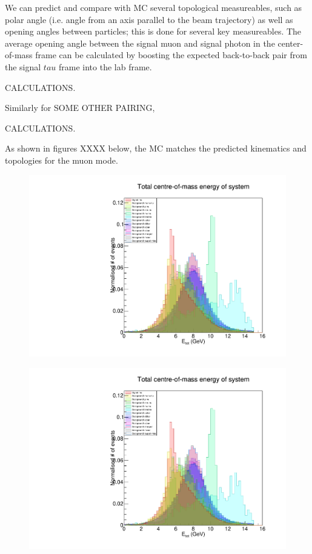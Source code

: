 \documentclass[12pt]{thesis}  %
\begin{document}
We can predict and compare with MC several topological measureables, such as polar angle (i.e. angle from an axis parallel to the beam trajectory) as well as opening angles between particles; this is done for several key measureables. The average opening angle between the signal muon and signal photon in the center-of-mass frame can be calculated by boosting the expected back-to-back pair from the signal $tau$ frame into the lab frame.

CALCULATIONS.

Similarly for SOME OTHER PAIRING,

CALCULATIONS.

As shown in figures XXXX below, the MC matches the predicted kinematics and topologies for the muon mode.


\begin{figure}[h]
\centering
\begin{minipage}{.5\textwidth}
  \centering
  \includegraphics[width=\linewidth]{images/stack/stack_cut6_totalCM_E.pdf}
  \label{fig:test1}
\end{minipage}%
\begin{minipage}{.5\textwidth}
  \centering
  \includegraphics[width=\linewidth]{images/stack/stack_cut6_totalCM_E.pdf}
  \label{fig:test2}
\end{minipage}
\end{figure}
\end{document}
